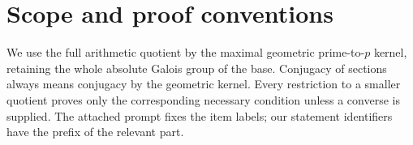 \section*{Scope and proof conventions}
We use the full arithmetic quotient by the maximal geometric prime-to-$p$ kernel, retaining the whole absolute Galois group of the base. Conjugacy of sections always means conjugacy by the geometric kernel. Every restriction to a smaller quotient proves only the corresponding necessary condition unless a converse is supplied. The attached prompt fixes the item labels; our statement identifiers have the prefix of the relevant part.
